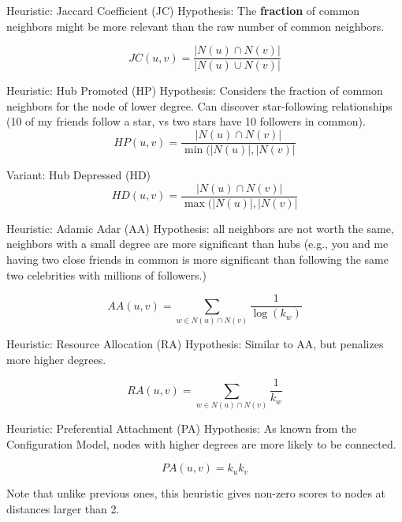 \documentclass[a4paper,11pt]{book}
\begin{document}
\begin{textbox}{Heuristic: Jaccard Coefficient (JC)}
Hypothesis: The \textbf{fraction} of common neighbors might be more relevant than the raw number of common neighbors.

\[
JC(u,v)=\frac{|N(u)\cap N(v)|}{|N(u)\cup N(v)|}
\]

\end{textbox}


\begin{textbox}{Heuristic: Hub Promoted (HP)}
Hypothesis: Considers the fraction of common neighbors for the node of lower degree. Can discover star-following relationships (10 of my friends follow a star, vs two stars have 10 followers in common).
\[
HP(u,v)=\frac{|N(u)\cap N(v)|}{\min(|N(u)|,| N(v)|}
\]

Variant: Hub Depressed (HD)
\[
HD(u,v)=\frac{|N(u)\cap N(v)|}{\max(|N(u)|,| N(v)|}
\]
\end{textbox}



\begin{textbox}{Heuristic: Adamic Adar (AA)}
Hypothesis: all neighbors are not worth the same, neighbors with a small degree are more significant than hubs (e.g., you and me having two close friends in common is more significant than following the same two celebrities with millions of followers.)

\[
AA(u,v)=\sum_{w\in N(u)\cap N(v)} \frac{1}{\log (k_w)}
\]

\end{textbox}


\begin{textbox}{Heuristic: Resource Allocation (RA)}
Hypothesis: Similar to AA, but penalizes more higher degrees.

\[
RA(u,v)=\sum_{w\in N(u)\cap N(v)} \frac{1}{k_w}
\]

\end{textbox}



\begin{textbox}{Heuristic: Preferential Attachment (PA)}
Hypothesis: As known from the Configuration Model, nodes with higher degrees are more likely to be connected.

\[
PA(u,v)=k_u k_v
\]

Note that unlike previous ones, this heuristic gives non-zero scores to nodes at distances larger than 2.
\end{textbox}
\end{document}
